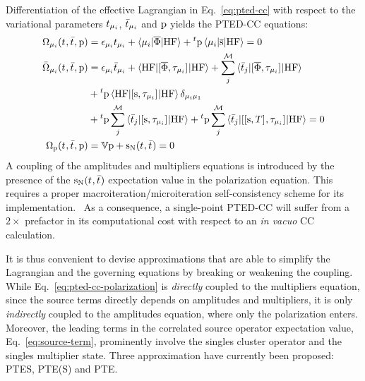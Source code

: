 Differentiation of the effective Lagrangian in Eq.~\eqref{eq:pted-cc}
with respect to the variational parameters $t_{\mu_i}$,
$\bar{t}_{\mu_i}$ and $\mathrm{p}$ yields the \acrshort{PTED}-\acrshort{CC}
equations:
\begin{subequations}
  \begin{align}
   \Omega_{\mu_i}(t_{}, \bar{t}_{}, \mathrm{p})  &=
   \epsilon_{\mu_i}t_{\mu_i} + \braket{\mu_i | \overline{\Phi} | \mathrm{HF}}
   + {}^t\mathrm{p}\braket{\mu_i | \overline{\mathrm{s}} | \mathrm{HF}}
             = 0 \label{eq:pted-cc-amplitudes}\\
   \bar{\Omega}_{\mu_i}(t_{}, \bar{t}_{}, \mathrm{p})
    &=
    \epsilon_{\mu_i}\bar{t}_{\mu_i} +
    \braket{\mathrm{HF} | [ \overline{\Phi}, \tau_{\mu_i} ]^{} | \mathrm{HF}} +
    \sum_{j}^{\mathcal{M}}\braket{\bar{t}_{j} |
    [ \overline{\Phi}, \tau_{\mu_i} ]^{} | \mathrm{HF}}
    \nonumber \\
    &+
    {}^t\mathrm{p}\braket{\mathrm{HF} | [ \mathrm{s}, \tau_{\mu_i} ]^{} | \mathrm{HF}}\delta_{\mu_i\mu_1} \nonumber \\
    &+
    {}^t\mathrm{p}\sum_{j}^{\mathcal{M}}\braket{\bar{t}_{j} | [ \mathrm{s}, \tau_{\mu_i} ]^{} | \mathrm{HF}}
    +
    {}^t\mathrm{p}\sum_{j}^{\mathcal{M}}\braket{\bar{t}_{j} | [ [ \mathrm{s}, T ]^{}, \tau_{\mu_i} ]^{} | \mathrm{HF}}
             = 0 \label{eq:pted-cc-multipliers}\\
    \Omega_{\mathrm{p}}(t_{}, \bar{t}_{}, \mathrm{p})
    &=
    \mathbb{V}\mathrm{p} + \mathrm{s}_{\mathrm{N}}(t_{}, \bar{t}_{}) = 0
    \label{eq:pted-cc-polarization}
  \end{align}
\end{subequations}
A coupling of the amplitudes and multipliers equations is introduced by
the presence of the $\mathrm{s}_{\mathrm{N}}(t_{}, \bar{t}_{})$ expectation value
in the polarization equation.
This requires a proper macroiteration/microiteration self-consistency
scheme for its implementation.~\autocite{Cammi2009-gu, Caricato2010-hx}
As a consequence, a single-point \acrshort{PTED}-\acrshort{CC} will suffer from a
$2\times$ prefactor in its computational cost with respect to an
\emph{in vacuo} \acrshort{CC} calculation.

It is thus convenient to devise approximations that are able to simplify the
Lagrangian and the governing equations by breaking or weakening the coupling.
While Eq.~\eqref{eq:pted-cc-polarization} is \emph{directly} coupled to
the multipliers equation, since the source terms directly depends on
amplitudes and multipliers, it is only \emph{indirectly} coupled to the
amplitudes equation, where only the polarization enters.
Moreover, the leading terms in the correlated source operator
expectation value, Eq.~\eqref{eq:source-term}, prominently involve the
singles cluster operator and the singles multiplier state.
Three approximation have currently been proposed: \acrshort{PTES}, \acrshort{PTE(S)}
and \acrshort{PTE}.

